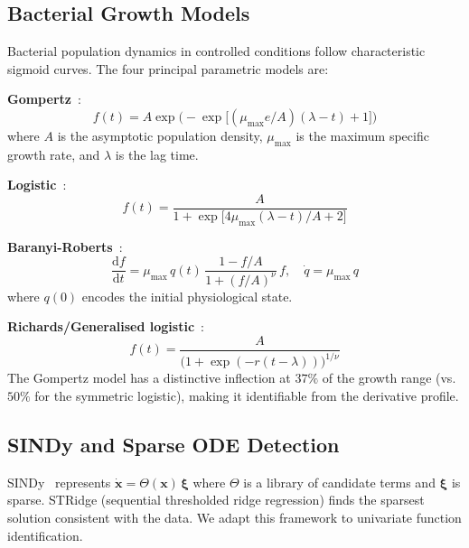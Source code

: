 \documentclass[11pt,a4paper]{article}
\begin{document}
\subsection{Bacterial Growth Models}

Bacterial population dynamics in controlled conditions follow characteristic sigmoid curves.
The four principal parametric models are:

\textbf{Gompertz}~\cite{gompertz1825}:
\begin{equation}
  f(t) = A \exp\!\bigl(-\exp\!\bigl[(\mu_{\max} e / A)(\lambda - t) + 1\bigr]\bigr)
  \label{eq:gompertz}
\end{equation}
where $A$ is the asymptotic population density, $\mu_{\max}$ is the maximum specific growth
rate, and $\lambda$ is the lag time.

\textbf{Logistic}~\cite{verhulst1838}:
\begin{equation}
  f(t) = \frac{A}{1 + \exp\!\bigl[4\mu_{\max}(\lambda - t)/A + 2\bigr]}
\end{equation}

\textbf{Baranyi-Roberts}~\cite{baranyi1994}:
\begin{equation}
  \frac{\mathrm{d}f}{\mathrm{d}t} = \mu_{\max}\,q(t)\,\frac{1 - f/A}{1 + (f/A)^\nu}\,f,
  \quad \dot{q} = \mu_{\max}\,q
\end{equation}
where $q(0)$ encodes the initial physiological state.

\textbf{Richards/Generalised logistic}~\cite{richards1959}:
\begin{equation}
  f(t) = \frac{A}{\bigl(1 + \exp(-r(t-\lambda))\bigr)^{1/\nu}}
\end{equation}
The Gompertz model has a distinctive inflection at $37\%$ of the growth range (vs.\ $50\%$
for the symmetric logistic), making it identifiable from the derivative profile.

\subsection{SINDy and Sparse ODE Detection}

SINDy~\cite{brunton2016} represents $\dot{\mathbf{x}} = \Theta(\mathbf{x})\,\boldsymbol{\xi}$
where $\Theta$ is a library of candidate terms and $\boldsymbol{\xi}$ is sparse. STRidge
(sequential thresholded ridge regression) finds the sparsest solution consistent with the data.
We adapt this framework to univariate function identification.

\end{document}

